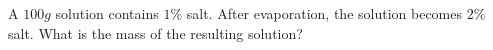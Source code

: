 A $100g$ solution contains $1\%$ salt. After evaporation, the solution becomes $2\%$ salt. What is the mass of the resulting solution?
